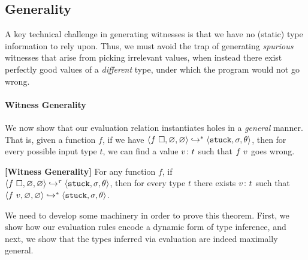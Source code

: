 
%
\subsection{Generality}\label{sec:soundness}

A key technical challenge in generating witnesses is
that we have no (static) type information to rely upon. Thus, we
must avoid the trap of generating \emph{spurious} witnesses that
arise from picking irrelevant values, when instead there exist
perfectly good values of a \emph{different} type, under which
the program would not go wrong.

\paragraph{Witness Generality}
We now show that our evaluation relation instantiates holes in a
\emph{general} manner. That is, given a function $f$, if we have
$\langle f\ \square{}, \varnothing, \varnothing \rangle \hookrightarrow^{*} \langle \mathtt{stuck}, \sigma, \theta \rangle$,
then for every possible input type $t$, we can find a value
${v} \colon {t}$ such that $f\ v$ goes wrong.

\begin{thm}{\textbf{[Witness Generality]}}
\label{thm:soundness}
  For any function $f$, if\\
  \hbox{$\langle f\ \square, \varnothing, \varnothing \rangle \hookrightarrow^{\tau} \langle \mathtt{stuck}, \sigma, \theta \rangle$,}
  then for every %
  type
  $t$ there exists ${v} \colon {t}$ such that
  $\langle f\ v, \varnothing, \varnothing \rangle \hookrightarrow^{*} \langle \mathtt{stuck}, \sigma, \theta \rangle$.
\end{thm}

We need to develop some machinery in order to prove this theorem.
First, we show how our evaluation rules encode a dynamic form of
type inference, and next, we show that the types inferred via
evaluation are indeed maximally general.

